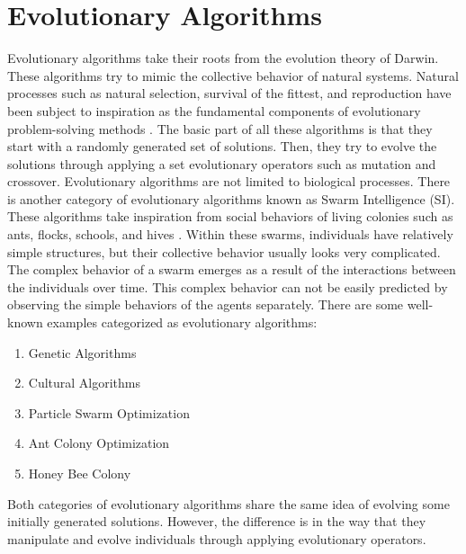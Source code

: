 \section{Evolutionary Algorithms}
Evolutionary algorithms take their roots from the evolution theory of Darwin. These algorithms try to mimic the collective behavior of natural systems. Natural processes such as natural selection, survival of the fittest, and reproduction have been subject to inspiration as the fundamental components of evolutionary problem-solving methods \cite{burke2005search}. The basic part of all these algorithms is that they start with a randomly generated set of solutions. Then, they try to evolve the solutions through applying a set evolutionary operators such as mutation and crossover. \newline
Evolutionary algorithms are not limited to biological processes. There is another category of evolutionary algorithms known as Swarm Intelligence (SI). These algorithms take inspiration from social behaviors of living colonies such as ants, flocks, schools, and hives \cite{kennedy2001swarm}. Within these swarms, individuals have relatively simple structures, but their collective behavior usually looks very complicated. The complex behavior of a swarm emerges as a result of the interactions between the individuals over time. This complex behavior can not be easily predicted by observing the simple behaviors of the agents separately. \newline
There are some well-known examples categorized as evolutionary algorithms:
\begin{enumerate}
	\item Genetic Algorithms
	\item Cultural Algorithms
	\item Particle Swarm Optimization
	\item Ant Colony Optimization
	\item Honey Bee Colony
\end{enumerate}
Both categories of evolutionary algorithms share the same idea of evolving some initially generated solutions. However, the difference is in the way that they manipulate and evolve individuals through applying evolutionary operators. 
